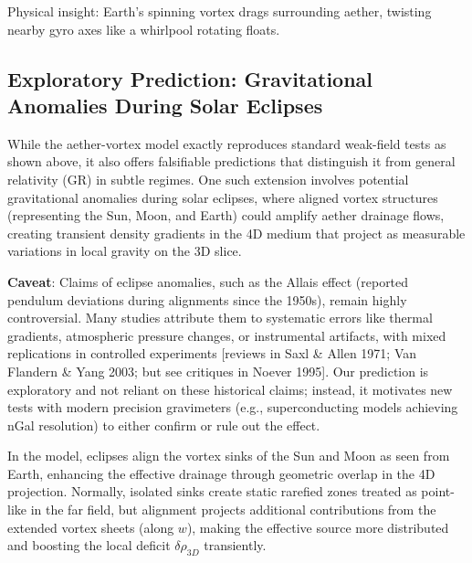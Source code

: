 Physical insight: Earth's spinning vortex drags surrounding aether, twisting nearby gyro axes like a whirlpool rotating floats.

\medskip
\noindent
{}
\medskip

\subsection{Exploratory Prediction: Gravitational Anomalies During Solar Eclipses}

While the aether-vortex model exactly reproduces standard weak-field tests as shown above, it also offers falsifiable predictions that distinguish it from general relativity (GR) in subtle regimes. One such extension involves potential gravitational anomalies during solar eclipses, where aligned vortex structures (representing the Sun, Moon, and Earth) could amplify aether drainage flows, creating transient density gradients in the 4D medium that project as measurable variations in local gravity on the 3D slice.

\textbf{Caveat}: Claims of eclipse anomalies, such as the Allais effect (reported pendulum deviations during alignments since the 1950s), remain highly controversial. Many studies attribute them to systematic errors like thermal gradients, atmospheric pressure changes, or instrumental artifacts, with mixed replications in controlled experiments [reviews in Saxl \& Allen 1971; Van Flandern \& Yang 2003; but see critiques in Noever 1995]. Our prediction is exploratory and not reliant on these historical claims; instead, it motivates new tests with modern precision gravimeters (e.g., superconducting models achieving nGal resolution) to either confirm or rule out the effect.

In the model, eclipses align the vortex sinks of the Sun and Moon as seen from Earth, enhancing the effective drainage through geometric overlap in the 4D projection. Normally, isolated sinks create static rarefied zones treated as point-like in the far field, but alignment projects additional contributions from the extended vortex sheets (along $w$), making the effective source more distributed and boosting the local deficit $\delta \rho_{3D}$ transiently.

